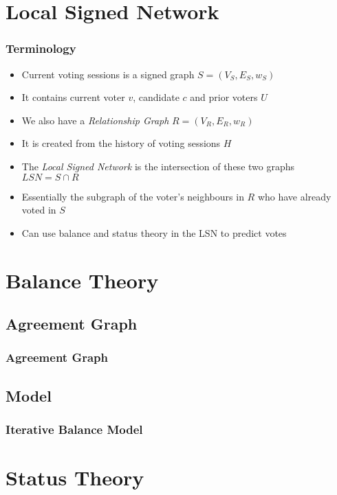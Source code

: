 \documentclass{beamer}
\begin{document}
\section{Local Signed Network}
\begin{frame}
    \frametitle{Terminology}
    \begin{itemize}
        \item Current voting sessions is a signed graph $S=(V_S,E_S,w_S)$
        \item It contains current voter $v$, candidate $c$ and prior voters $U$
        \item We also have a \textit{Relationship Graph} $R = (V_R,E_R,w_R)$
        \item It is created from the history of voting sessions $H$
        \item The \textit{Local Signed Network} is the intersection of these two graphs $LSN = S \cap R$
        \item Essentially the subgraph of the voter's neighbours in $R$ who have already voted in $S$
        \item Can use balance and status theory in the LSN to predict votes
    \end{itemize}
    

\end{frame}

\section{Balance Theory}

\subsection{Agreement Graph}
\begin{frame}
    \frametitle{Agreement Graph}

    

\end{frame}
\subsection{Model}
\begin{frame}
    \frametitle{Iterative Balance Model}
    \centering
    \scalebox{0.7}{}

\end{frame}

\section{Status Theory}
\end{document}
